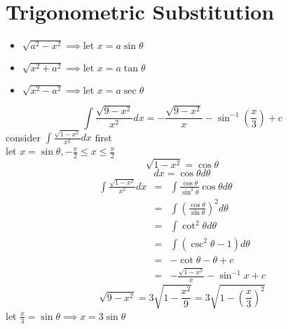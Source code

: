 \section{Trigonometric Substitution}
\begin{notn}
\begin{itemize}
\item $\displaystyle \sqrt{a^2-x^2} \implies \text{let } x = a \sin \theta$
\item $\displaystyle \sqrt{x^2 + a^2} \implies \text{let } x = a \tan \theta$
\item $\displaystyle \sqrt{x^2 - a^2} \implies \text{let } x = a \sec \theta$
\end{itemize}
\end{notn}
\begin{eg}
$$\displaystyle \int \frac{\sqrt{9-x^2}}{x^2} dx = - \frac{\sqrt{9-x^2}}{x} - \sin^{-1} (\frac{x}{3}) + c$$
consider $\displaystyle \int \frac{\sqrt{1-x^2}}{x^2} dx$ first\\
let $\displaystyle x = \sin \theta, -\frac{\pi}{2} \leq x \leq \frac{\pi}{2}$
$$\sqrt{1-x^2} = \cos \theta$$
$$dx = \cos \theta d \theta$$
$$\begin{array}{rcl}
\displaystyle \int \frac{\sqrt{1-x^2}}{x^2} dx & = & \displaystyle \int \frac{\cos \theta}{\sin^2 \theta} \cos \theta d\theta\\
& = & \displaystyle \int (\frac{\cos \theta}{\sin \theta})^2 d\theta\\
& = & \displaystyle \int \cot^2 \theta d\theta\\
& = & \displaystyle \int (\csc^2 \theta -1)d\theta\\
& = & -\cot \theta - \theta +c\\
& = & \displaystyle - \frac{\sqrt{1-x^2}}{x} - \sin^{-1} x +c
\end{array}$$
$$\displaystyle \sqrt{9-x^2} = 3 \sqrt{1-\frac{x^2}{9}} = 3 \sqrt{1-(\frac{x}{3})^2}$$
let $\displaystyle \frac{x}{3} = \sin \theta \implies x = 3 \sin \theta$
\end{eg}
